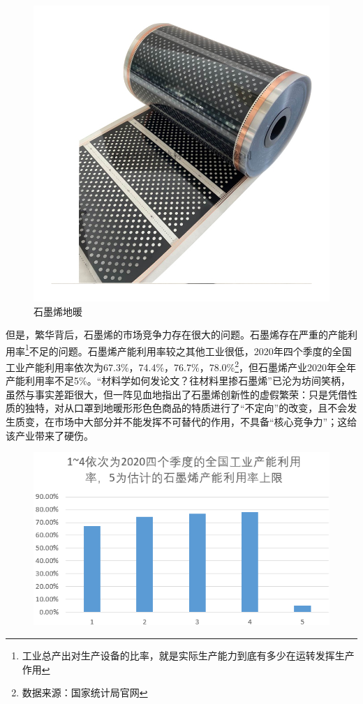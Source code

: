 \begin{figure}
    \centering
    \includegraphics[scale=0.2]{img/6.png}
    \caption{石墨烯地暖}
\end{figure}

但是，繁华背后，石墨烯的市场竞争力存在很大的问题。石墨烯存在严重的产能利用率\footnote{工业总产出对生产设备的比率，就是实际生产能力到底有多少在运转发挥生产作用}不足的问题。石墨烯产能利用率较之其他工业很低，2020年四个季度的全国工业产能利用率依次为67.3\%，74.4\%，76.7\%，78.0\%\footnote{数据来源：国家统计局官网}，但石墨烯产业2020年全年产能利用率不足5\%。“材料学如何发论文？往材料里掺石墨烯”已沦为坊间笑柄，虽然与事实差距很大，但一阵见血地指出了石墨烯创新性的虚假繁荣：只是凭借性质的独特，对从口罩到地暖形形色色商品的特质进行了“不定向”的改变，且不会发生质变，在市场中大部分并不能发挥不可替代的作用，不具备“核心竞争力”；这给该产业带来了硬伤。

\begin{figure}
    \centering
    \includegraphics[scale=0.6]{img/7.png}
\end{figure}

